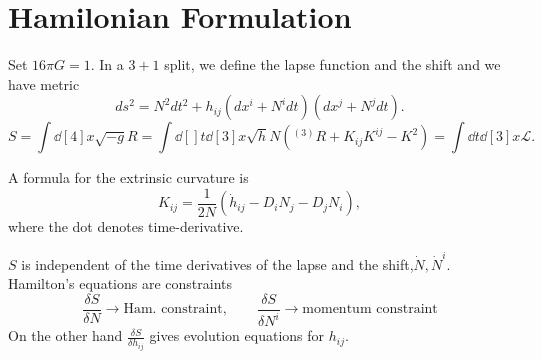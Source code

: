 \section{Hamilonian Formulation}%
\label{sec:hamilonian_formulation}

Set $16 \pi G = 1$.
In a $3 + 1$ split, we define the lapse function and the shift and we have metric
\begin{equation}
  ds^2 = N^2 dt^2 + h_{ij} (dx^{i} + N^{i} dt) (dx^{j} + N^{j} dt).
\end{equation}
\begin{equation}
  S = \int \dd[4]{x} \sqrt{-g } R = \int \dd[]{t} \dd[3]{x} \sqrt{h} N ({}^{(3)} R + K_{ij} K^{ij} - K^2) = \int \dd{t} \dd[3]{x} \mathscr{L}.
\end{equation}

\begin{exercise}[Sheet 2]
  A formula for the extrinsic curvature is
  \begin{equation}
    K_{ij} = \frac{1}{2 N} (\dot{h}_{ij} - D_{i} N_j - D_j N_i),
  \end{equation}
  where the dot denotes time-derivative.
\end{exercise}
\begin{remark}
  $S$ is independent of the time derivatives of the lapse and the shift,$\dot{N}, \dot{N}^{i}$. Hamilton's equations are constraints
  \begin{equation}
    \frac{\delta S}{\delta N} \rightarrow \text{Ham.~constraint}, \qquad 
    \frac{\delta S}{\delta N^{i}} \rightarrow \text{momentum constraint}
  \end{equation}
  On the other hand $\frac{\delta S}{\delta h_{ij}}$ gives evolution equations for $h_{ij}$.
\end{remark}
